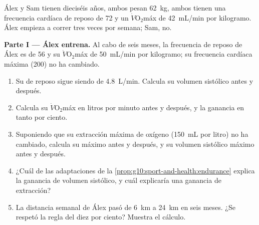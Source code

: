 \begin{problem}
\label{pb:g10:sport-and-health:1}
Álex y Sam tienen dieciséis años, ambos pesan \qty{62}{kg}, ambos
tienen una frecuencia cardíaca de reposo de 72 y un
$\dot V\!\mathrm{O_2}$máx de \qty{42}{mL/min} por kilogramo. Álex
empieza a correr tres veces por semana; Sam, no.

\medskip
\noindent\textbf{Parte I --- Álex entrena.}
Al cabo de seis meses, la frecuencia de reposo de Álex es de 56 y su
$\dot V\!\mathrm{O_2}$máx de \qty{50}{mL/min} por kilogramo; su
frecuencia cardíaca máxima (200) no ha cambiado.
\begin{enumerate}
  \item Su  de reposo sigue siendo de \qty{4.8}{L/min}.
        Calcula su volumen sistólico antes y después.
  \item Calcula su $\dot V\!\mathrm{O_2}$máx en litros por minuto antes
        y después, y la ganancia en tanto por ciento.
  \item Suponiendo que su extracción máxima de oxígeno (\qty{150}{mL}
        por litro) no ha cambiado, calcula su  máximo
        antes y después, y su volumen sistólico máximo antes y después.
  \item ¿Cuál de las adaptaciones de la
        \cref{prop:g10:sport-and-health:endurance} explica la ganancia
        de volumen sistólico, y cuál explicaría una ganancia de
        extracción?
  \item La distancia semanal de Álex pasó de \qty{6}{km} a \qty{24}{km}
        en seis meses. ¿Se respetó la regla del diez por ciento?
        Muestra el cálculo.
\end{enumerate}


\end{problem}
